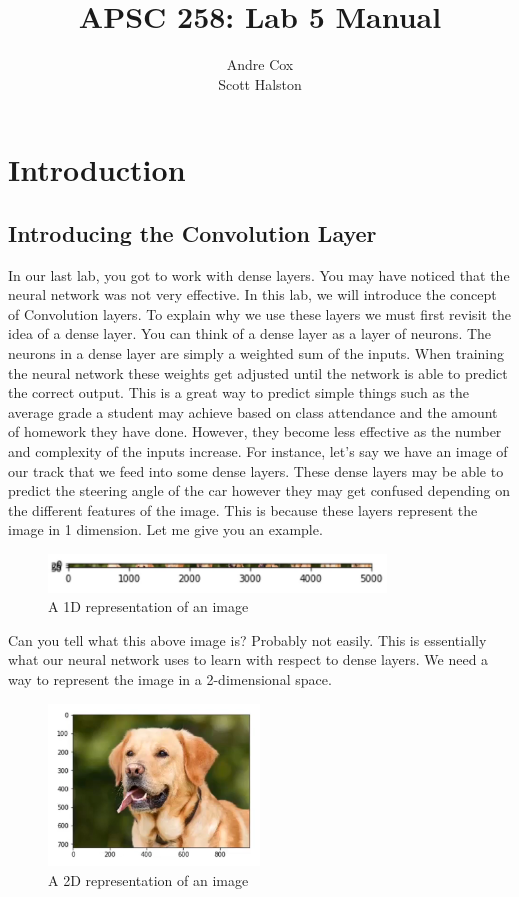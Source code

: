 \documentclass[11pt]{report}
\title{APSC 258: Lab 5 Manual}
\author{Andre Cox \\ Scott Halston}
\begin{document}
\maketitle
\tableofcontents

\clearpage

\chapter{Introduction}
\section{Introducing the Convolution Layer}
In our last lab, you got to work with dense layers. You may have noticed that the neural network was not very effective. In this lab, we will introduce the concept of Convolution layers. To explain why we use these layers we must first revisit the idea of a dense layer. You can think of a dense layer as a layer of neurons. The neurons in a dense layer are simply a weighted sum of the inputs. When training the neural network these weights get adjusted until the network is able to predict the correct output. This is a great way to predict simple things such as the average grade a student may achieve based on class attendance and the amount of homework they have done. However, they become less effective as the number and complexity of the inputs increase. For instance, let's say we have an image of our track that we feed into some dense layers. These dense layers may be able to predict the steering angle of the car however they may get confused depending on the different features of the image. This is because these layers represent the image in 1 dimension. Let me give you an example. 

\begin{figure}[h]
\centering
\includegraphics[width=0.8\textwidth]{./images/dogdense.png}
\caption{A 1D representation of an image}
\label{fig:1d}
\end{figure}

Can you tell what this above image is? Probably not easily. This is essentially what our neural network uses to learn with respect to dense layers. We need a way to represent the image in a 2-dimensional space.

\begin{figure}[h]
\centering
\includegraphics[width=0.5\textwidth]{./images/dogconv.png}
\caption{A 2D representation of an image}
\label{fig:2d}
\end{figure}
\end{document}
